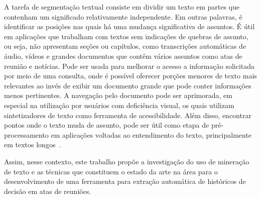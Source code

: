 A tarefa de segmentação textual consiste em dividir um texto em partes que contenham um significado relativamente independente. Em outras palavras, é identificar as posições nas quais há uma mudança significativa de assuntos. É útil em aplicações que trabalham com textos sem indicações de quebras de assunto, ou seja, não apresentam seções ou capítulos, como transcrições automáticas de áudio, vídeos e grandes documentos que contêm vários assuntos como atas de reunião e notícias. Pode ser usada para melhorar o acesso a informação solicitada por meio de uma consulta, onde é possível oferecer porções menores de texto mais relevantes ao invés de exibir um documento grande que pode conter informações menos pertinentes. A navegação pelo documento pode ser aprimorada, em especial na utilização por usuários com deficiência visual, os quais utilizam  sintetizadores de texto como ferramenta de acessibilidade. Além disso, encontrar pontos onde o texto muda de assunto, pode ser útil como etapa de pré-processamento em aplicações voltadas ao entendimento do texto, principalmente em textos longos~\cite{Choi2000}.



Assim, nesse contexto, este trabalho propõe a investigação do uso de mineração de texto e as técnicas que constituem o estado da arte na área para o desenvolvimento de uma ferramenta para extração automática de históricos de decisão em atas de reuniões.
